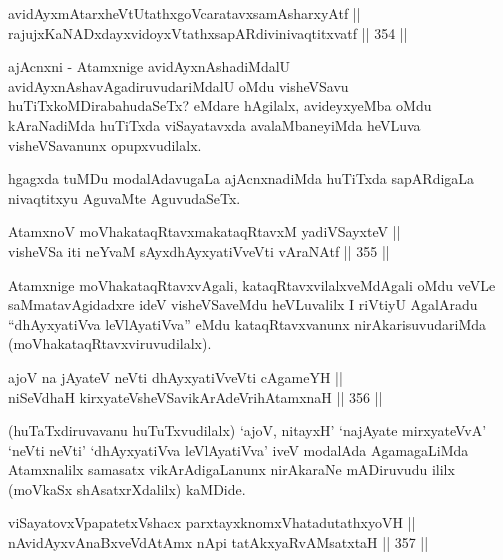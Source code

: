 \begin{shl}
avidAyxmAtarxheVtUtathxgoVcaratavxsamAsharxyAtf || \\
rajujxKaNADxdayxvidoyxVtathxsapARdivinivaqtitxvatf \hfill || 354 ||  
\end{shl}

\begin{artha}
ajAcnxni - Atamxnige avidAyxnAshadiMdalU
avidAyxnAshavAgadiruvudariMdalU oMdu visheVSavu
huTiTxkoMDirabahudaSeTx? eMdare hAgilalx, avideyxyeMba oMdu
kAraNadiMda huTiTxda viSayatavxda avalaMbaneyiMda heVLuva
visheVSavanunx opupxvudilalx.
\end{artha}

\begin{artha}
hgagxda tuMDu modalAdavugaLa ajAcnxnadiMda huTiTxda sapARdigaLa
nivaqtitxyu AguvaMte AguvudaSeTx.
\end{artha}


\begin{shl}
AtamxnoV moVhakataqRtavxmakataqRtavxM yadiVSayxteV || \\
visheVSa iti neYvaM sAyxdhAyxyatiVveVti vAraNAtf \hfill || 355 ||  
\end{shl}

\begin{artha}
Atamxnige moVhakataqRtavxvAgali, kataqRtavxvilalxveMdAgali oMdu veVLe
saMmatavAgidadxre ideV visheVSaveMdu heVLuvalilx I riVtiyU AgalAradu
``dhAyxyatiVva leVlAyatiVva'' eMdu kataqRtavxvanunx
nirAkarisuvudariMda (moVhakataqRtavxviruvudilalx).
\end{artha}


\begin{shl}
ajoV na jAyateV neVti dhAyxyatiVveVti cA\s \s gameYH || \\
niSeVdhaH kirxyateV\s sheVSavikArAdeVrihA\s \s tamxnaH \hfill || 356 ||  
\end{shl}

\begin{artha}
(huTaTxdiruvavanu huTuTxvudilalx) `ajoV, nitayxH' `najAyate
mirxyateVvA' `neVti neVti' `dhAyxyatiVva leVlAyatiVva' iveV modalAda
AgamagaLiMda Atamxnalilx samasatx vikArAdigaLanunx nirAkaraNe
mADiruvudu ililx (moVkaSx shAsatxrXdalilx) kaMDide.
\end{artha}

\begin{shl}
viSayatovxVpapatetxVshacx parxtayxknomxVhatadutathxyoVH ||  \\
nAvidAyxvAnaBxveVdAtAmx nApi tatAkxyaRvAMsatxtaH \hfill || 357 ||  
\end{shl}

